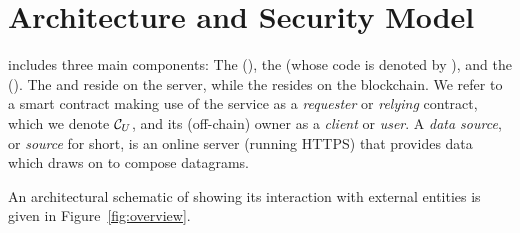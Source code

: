  \section{Architecture and Security Model}
 \label{sec:architecture}

 \tcs includes three main components: The \tcontract (\tcont), the \encname (whose code is denoted by \engine), and the \medname (\relay). The \encname and \medname reside on the \tc server, while the \tcontract  resides on the blockchain. We refer to a smart contract making use of the \tcs service as a {\em requester} or {\em relying} contract, which we denote $\reqcont$, and its (off-chain) owner as a \emph{client} or \emph{user}. A \emph{data source}, or \emph{source} for short, is an online server (running HTTPS) that provides data which \tc draws on to compose datagrams. 

An architectural schematic of \tc showing its interaction with external entities is given in Figure~\ref{fig:overview}.


